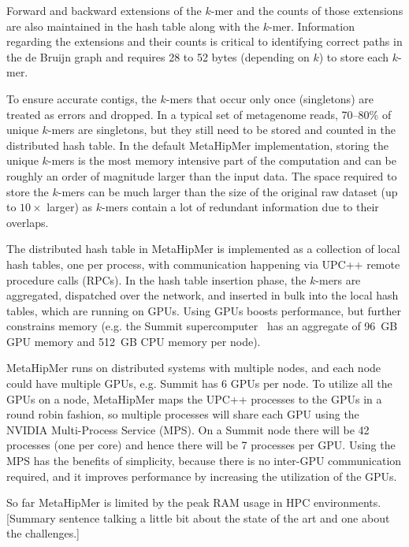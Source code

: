 Forward and backward extensions of the $k$-mer and the counts of those
extensions are also maintained in the hash table along with the $k$-mer.
Information regarding the extensions and their counts is critical to identifying
correct paths in the de Bruijn graph and requires 28 to 52 bytes (depending on
$k$) to store each $k$-mer.

To ensure accurate contigs, the $k$-mers that occur only once (singletons) are
treated as errors and dropped. In a typical set of metagenome reads, 70--80\%
of unique $k$-mers are singletons, but they still need to be stored and counted
in the distributed hash table. In the default MetaHipMer implementation, storing
the unique $k$-mers is the most memory intensive part of the computation and can
be roughly an order of magnitude larger than the input data.  The space required
to store the $k$-mers can be much larger than the size of the original raw
dataset (up to $10\times$ larger) as $k$-mers contain a lot of redundant
information due to their overlaps.

The distributed hash table in MetaHipMer is implemented as a collection of local
hash tables, one per process, with communication happening via UPC++ remote
procedure calls (RPCs). In the hash table insertion phase, the $k$-mers are
aggregated, dispatched over the network, and inserted in bulk into the local
hash tables, which are running on GPUs. Using GPUs boosts performance, but
further constrains memory (e.g. the Summit supercomputer~\cite{VazhkudaiDBG18}
has an aggregate of 96~GB GPU memory and 512~GB CPU memory per node).

MetaHipMer runs on distributed systems with multiple nodes, and each node could
have multiple GPUs, e.g. Summit has 6 GPUs per node. To utilize all the GPUs on
a node, MetaHipMer maps the UPC++ processes to the GPUs in a round robin
fashion, so multiple processes will share each GPU using the NVIDIA
Multi-Process Service (MPS)\@. On a Summit node there will be 42 processes (one
per core) and hence there will be 7 processes per GPU\@. Using the MPS has the
benefits of simplicity, because there is no inter-GPU communication required,
and it improves performance by increasing the utilization of the GPUs.

\begin{rproblem}
So far MetaHipMer is limited by the peak RAM usage in HPC environments.
[Summary sentence talking a little bit about the state of the art and one about the challenges.]
\label{rprob:peppermint4}
\end{rproblem}


